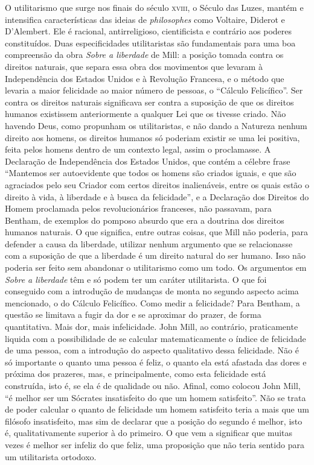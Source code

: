 O utilitarismo que surge nos finais do século \textsc{xviii}, o Século das Luzes,
mantém e intensifica características das ideias de \textit{philosophes}
como Voltaire, Diderot e D'Alembert. Ele é racional, antirreligioso,
cientificista e contrário aos poderes constituídos. Duas
especificidades utilitaristas são fundamentais para uma boa compreensão
da obra \textit{Sobre a liberdade} de Mill: a posição tomada contra os
direitos naturais, que separa essa obra dos movimentos que levaram à
Independência dos Estados Unidos e à Revolução Francesa, e o método que
levaria a maior felicidade ao maior número de pessoas, o ``Cálculo
Felicífico''. Ser contra os direitos naturais significava ser contra a
suposição de que os direitos humanos existissem anteriormente a
qualquer Lei que os tivesse criado. Não havendo Deus, como propunham os
utilitaristas, e não dando a Natureza nenhum direito aos homens, os
direitos humanos só poderiam existir se uma lei positiva, feita pelos
homens dentro de um contexto legal, assim o proclamasse. A Declaração
de Independência dos Estados Unidos, que contém a célebre frase
``Mantemos ser autoevidente que todos os homens são criados
iguais, e que são agraciados pelo seu Criador com certos direitos
inalienáveis, entre os quais estão o direito à vida, à liberdade e à
busca da felicidade'', e a Declaração dos Direitos do Homem proclamada
pelos revolucionários franceses, não passavam, para Bentham, de exemplos
do pomposo absurdo que era a doutrina dos direitos humanos naturais. O
que significa, entre outras coisas, que Mill não poderia, para defender
a causa da liberdade, utilizar nenhum argumento que se
relacionasse com a suposição de que a liberdade é um direito natural do
ser humano. Isso não poderia ser feito sem abandonar o utilitarismo
como um todo. Os argumentos em \textit{Sobre a liberdade} têm e só
podem ter um caráter utilitarista. O que foi conseguido com a
introdução de mudanças de monta no segundo aspecto acima mencionado, o
do Cálculo Felicífico. Como medir a felicidade? Para Bentham, a questão
se limitava a fugir da dor e se aproximar do prazer, de forma
quantitativa. Mais dor, mais infelicidade. John Mill, ao contrário,
praticamente liquida com a possibilidade de se calcular matematicamente
o índice de felicidade de uma pessoa, com a introdução do aspecto
qualitativo dessa felicidade. Não é só importante o quanto uma pessoa é
feliz, o quanto ela está afastada das dores e próxima dos prazeres, mas,
e principalmente, como esta felicidade está construída, isto é, se ela é
de qualidade ou não. Afinal, como colocou John Mill, ``é melhor
ser um Sócrates insatisfeito do que um homem satisfeito''. Não se trata
de poder calcular o quanto de felicidade um homem satisfeito teria a
mais que um filósofo insatisfeito, mas sim de declarar que a posição do
segundo é melhor, isto é, qualitativamente superior à do primeiro. O
que vem a significar que muitas vezes é melhor ser infeliz do que
feliz, uma proposição que não teria sentido para um utilitarista ortodoxo. 

